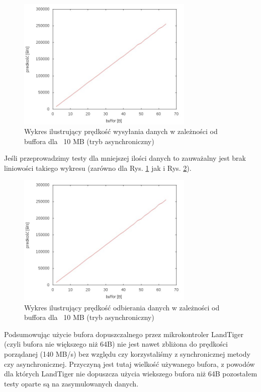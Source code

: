 \documentclass{BscUS}
\begin{document}

\begin{figure}[H]
{
\centering
\includegraphics[width=0.75\textwidth]{./img/A_10737420Send}
\caption{Wykres ilustrujący prędkość wysyłania danych w zależności od buffora dla ~10 MB (tryb asynchroniczny)}
\label{fig:A_10737420Send}
}
\end{figure}

Jeśli przeprowadzimy testy dla mniejszej ilości danych to zauważalny jest brak liniowości takiego wykresu (zarówno dla Rys. \ref{fig:A_10737420Send} jak i Rys. \ref{fig:A_10737420Receive}).
\begin{figure}[H]
{
\centering
\includegraphics[width=0.75\textwidth]{./img/A_10737420Receive}
\caption{Wykres ilustrujący prędkość odbierania danych w zależności od buffora dla ~10 MB (tryb asynchroniczny)}
\label{fig:A_10737420Receive}
}
\end{figure}

Podsumowując użycie bufora dopuszczalnego przez mikrokontroler LandTiger (czyli bufora nie większego niż 64B) nie jest nawet zbliżona do prędkości porządanej (140 MB/s) bez względu czy korzystaliśmy z synchronicznej metody czy asynchronicznej. Przyczyną jest tutaj wielkość używanego bufora, z powodów dla których LandTiger nie dopuszcza użycia wiekszego bufora niż 64B  pozostałem testy oparte są na zasymulowanych danych. 
\newline
\end{document}
